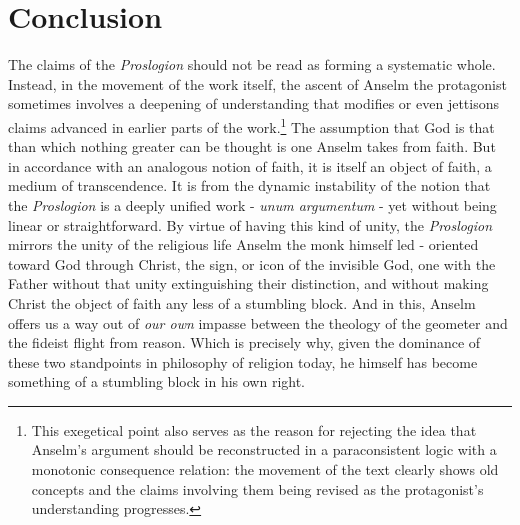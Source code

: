 \documentclass[]{birkjour}
\begin{document}
\section{Conclusion}
The claims of the \textit{Proslogion} should not be read as forming a systematic whole. Instead, in the movement of the work itself, the ascent of Anselm the protagonist sometimes involves a deepening of understanding that modifies or even jettisons claims advanced in earlier parts of the work.\footnote{This exegetical point also serves as the reason for rejecting the idea that Anselm's argument should be reconstructed in a paraconsistent logic with a monotonic consequence relation: the movement of the text clearly shows old concepts and the claims involving them being revised as the protagonist's understanding progresses.} The assumption that God is that than which nothing greater can be thought is one Anselm takes from faith. But in accordance with an analogous notion of faith, it is itself an object of faith, a medium of transcendence. It is from the dynamic instability of the notion that the \textit{Proslogion} is a deeply unified work - \textit{unum argumentum} - yet without being linear or straightforward. By virtue of having this kind of unity, the \textit{Proslogion} mirrors the unity of the religious life Anselm the monk himself led - oriented toward God through Christ, the sign, or icon of the invisible God, one with the Father without that unity extinguishing their distinction, and without making Christ the object of faith any less of a stumbling block. And in this, Anselm offers us a way out of \textit{our own} impasse between the theology of the geometer and the fideist flight from reason. Which is precisely why, given the dominance of these two standpoints in philosophy of religion today, he himself has become something of a stumbling block in his own right.
\printbibliography
\end{document}
